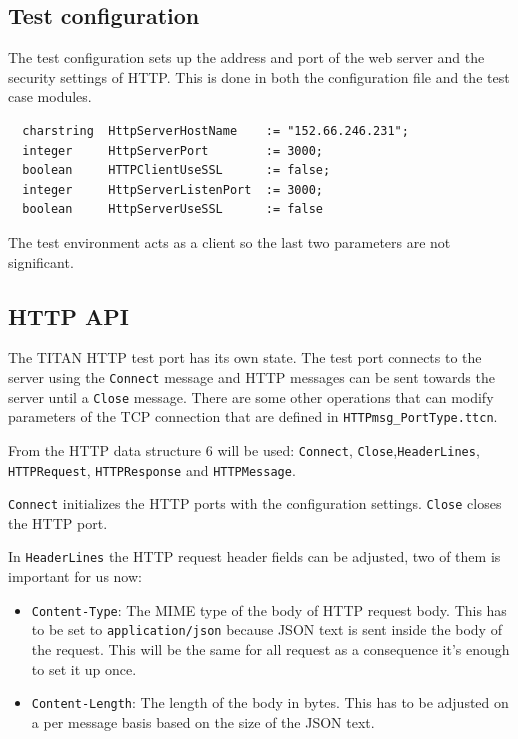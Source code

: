 \documentclass[a4paper]{article}
\begin{document}
\subsection{Test configuration}
The test configuration sets up the address and port of the web server and the security settings of HTTP. This is done in both the configuration file and the test case modules.

{\footnotesize
\begin{lstlisting}
  charstring  HttpServerHostName    := "152.66.246.231";
  integer     HttpServerPort        := 3000;
  boolean     HTTPClientUseSSL      := false;
  integer     HttpServerListenPort  := 3000;
  boolean     HttpServerUseSSL      := false
\end{lstlisting}
}

The test environment acts as a client so the last two parameters are not significant.

\subsection{HTTP API}
The TITAN HTTP test port has its own state. The test port connects to the server using the \verb!Connect! message and HTTP messages can be sent towards the server until a \verb!Close! message. There are some other operations that can modify parameters of the TCP connection that are defined in \verb/HTTPmsg_PortType.ttcn/.

From the HTTP data structure 6 will be used: \verb/Connect/, 
\verb!Close!,\verb/HeaderLines/,
\verb/HTTPRequest/, \verb!HTTPResponse! and \verb!HTTPMessage!.

\verb/Connect/ initializes the HTTP ports with the configuration settings. \verb!Close! closes the HTTP port.

In \verb/HeaderLines/ the HTTP request header fields can be adjusted, two of them is important for us now:
\begin{itemize}
\item \verb!Content-Type!:  The MIME type of the body of HTTP request body. This has to be set to \verb!application/json! because JSON text is sent inside the body of the request. This will be the same for all request as a consequence it's enough to set it up once.
\item \verb!Content-Length!: The length of the body in bytes. This has to be adjusted on a per message basis based on the size of the JSON text.
\end{itemize}
\end{document}
